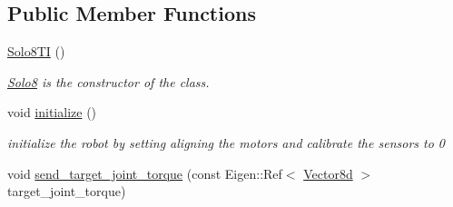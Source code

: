 \subsection*{Public Member Functions}
\begin{DoxyCompactItemize}
\item 
\hyperlink{classblmc__robots_1_1Solo8TI_a5f969910cd1f1b263297e02691a0df5a}{Solo8\+TI} ()
\begin{DoxyCompactList}\small\item\em \hyperlink{classblmc__robots_1_1Solo8}{Solo8} is the constructor of the class. \end{DoxyCompactList}\item 
void \hyperlink{classblmc__robots_1_1Solo8TI_adf9f5ed10293942b1ce06d0d0116f61c}{initialize} ()
\begin{DoxyCompactList}\small\item\em initialize the robot by setting aligning the motors and calibrate the sensors to 0 \end{DoxyCompactList}\item 
void \hyperlink{classblmc__robots_1_1Solo8TI_a5299053c499b95be35685aed60fc8d50}{send\+\_\+target\+\_\+joint\+\_\+torque} (const Eigen\+::\+Ref$<$ \hyperlink{common__header_8hpp_a98975ffbe0bca1296078e0350dfedd60}{Vector8d} $>$ target\+\_\+joint\+\_\+torque)\hypertarget{classblmc__robots_1_1Solo8TI_a5299053c499b95be35685aed60fc8d50}{}\label{classblmc__robots_1_1Solo8TI_a5299053c499b95be35685aed60fc8d50}


\end{DoxyCompactItemize}

